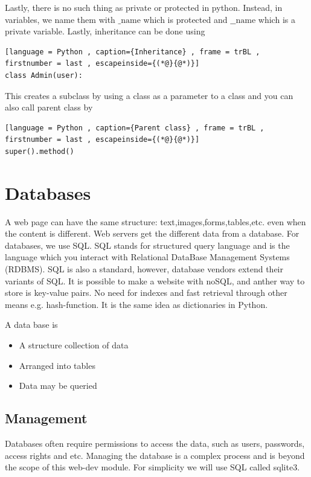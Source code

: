 \documentclass[a4paper]{article}
\theoremstyle{plain}
\theoremstyle{definition}
\newtheorem{defn}{Definition}[section]
\theoremstyle{remark}
\begin{document}
\begin{flushleft}
Lastly, there is no such thing as private or protected in python. Instead, in variables, we name them with $\_\text{name}$ which is protected and $\_\_\text{name}$ which is a private variable. Lastly, inheritance can be done using 
\begin{lstlisting}[language = Python , caption={Inheritance} , frame = trBL , firstnumber = last , escapeinside={(*@}{@*)}]
class Admin(user):
\end{lstlisting}
This creates a subclass by using a class as a parameter to a class and you can also call parent class by
\begin{lstlisting}[language = Python , caption={Parent class} , frame = trBL , firstnumber = last , escapeinside={(*@}{@*)}]
super().method()
\end{lstlisting}
\section{Databases}
A web page can have the same structure: text,images,forms,tables,etc. even when the content is different. Web servers get the different data from a database. For databases, we use SQL. SQL stands for structured query language and is the language which you interact with Relational DataBase Management Systems (RDBMS). SQL is also a standard, however, database vendors extend their variants of SQL. It is possible to make a website with noSQL, and anther way to store is key-value pairs. No need for indexes and fast retrieval through other means e.g. hash-function. It is the same idea as dictionaries in Python. 
\begin{tcolorbox}[colback=black!3!white,colframe=black!60!white,title=\begin{defn}Database \label{Database}\end{defn}]
A data base is
\begin{itemize}
	\item A structure collection of data
	\item Arranged into tables
	\item Data may be queried
\end{itemize}
\end{tcolorbox}
\subsection{Management}
Databases often require permissions to access the data, such as users, passwords, access rights and etc. Managing the database is a complex process and is beyond the scope of this web-dev module. For simplicity we will use SQL called sqlite3. 

\end{flushleft}
\end{document}
